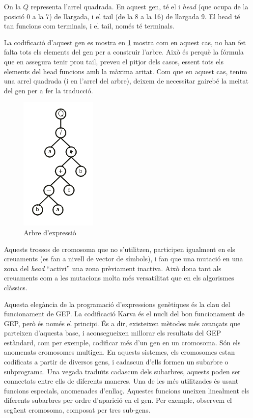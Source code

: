On la $Q$ representa l'arrel quadrada.  En aquest gen, té el i \emph{head} (que ocupa
de la posició 0 a la 7) de llargada, i el tail (de la 8 a la 16) de llargada 9.
El head té tan funcions com terminals, i el tail, només té terminals.

La codificació d'aquest gen es mostra en \ref{fig:unfinished} mostra com en aquest cas,
no han fet falta tots els elements del gen per a construir l'arbre.  Això és
perquè la fórmula que en assegura tenir prou tail, preveu el pitjor dels casos,
essent tots els elements del head funcions amb la màxima aritat.  Com que en
aquest cas, tenim una arrel quadrada (i en l'arrel del arbre), deixem de
necessitar gairebé la meitat del gen per a fer la traducció.

\begin{figure}[h]
\begin{center}
\includegraphics{geptut/pt02.png}
\end{center}
\caption{Arbre d'expressió}
\label{fig:unfinished}
\end{figure}

Aquests trossos de cromosoma que no s'utilitzen, participen igualment en els
creuaments (es fan a nivell de vector de símbols), i fan que una mutació en una
zona del \emph{head} ``activi'' una zona prèviament inactiva.  Això dona tant
als creuaments com a les mutacions molta més versatilitat que en els algorismes
clàssics.

Aquesta elegància de la programació d'expressions genètiques és la clau del
funcionament de GEP.  La codificació Karva és el nucli del bon funcionament de
GEP, però és només el principi.  És a dir, existeixen mètodes més avançats que
parteixen d'aquesta base, i aconsegueixen millorar els resultats del GEP
estàndard, com per exemple, codificar més d'un gen en un cromosoma. Són els
anomenats cromosomes multigen.  En aquests sistemes, els cromosomes estan
codificats a partir de diversos gens, i cadascun d'ells formen un subarbre o
subprograma.  Una vegada traduïts cadascun dels subarbres, aquests poden ser
connectats entre ells de diferents maneres.  Una de les més utilitzades és usant
funcions especials, anomenades d'enllaç. Aquestes funcions uneixen linealment
els diferents subarbres per ordre d'aparició en el gen.  Per exemple, observem
el següent cromosoma, composat per tres sub-gens.

